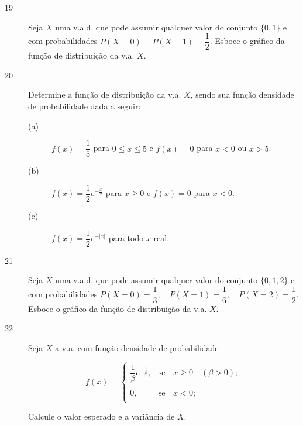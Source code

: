 \documentclass{report}
\begin{document}
\begin{description}

\item[{\large 19}] Seja $X$ uma v.a.d. que pode assumir qualquer valor do conjunto $\{0,1\}$ e com probabilidades $P(X=0)=P(X=1)=\dfrac{1}{2}$. Esboce o gráfico da função de distribuição da v.a. $X$.

\end{description}

\newpage

\begin{description}

\item[{\large 20}] Determine a função de distribuição da v.a. $X$, sendo sua função densidade de probabilidade dada a seguir:


\begin{description}

\item[(a)] $f(x)=\dfrac{1}{5}$ para $0\leq x\leq 5$ e $f(x)=0$ para $x<0$ ou $x>5$.
\item[(b)] $f(x)=\dfrac{1}{2}e^{-\frac{x}{2}}$ para $x\geq 0$ e $f(x)=0$ para $x<0$.
\item[(c)] $f(x)=\dfrac{1}{2}e^{-|x|}$ para todo $x$ real.
\end{description}

\end{description}

\begin{description}

\item[{\large 21}] Seja $X$ uma v.a.d. que pode assumir qualquer valor do conjunto $\{0,1,2\}$ e com probabilidades $P(X=0)=\dfrac{1}{3},\quad P(X=1)=\dfrac{1}{6},\quad P(X=2)=\dfrac{1}{2}$. Esboce o gráfico da função de distribuição da v.a. $X$.

\end{description}


\begin{description}

\item[{\large 22}] Seja $X$ a v.a. com função densidade de probabilidade

    \begin{center}
\begin{displaymath}
f(x)=\left\{
\begin{array}{ccccc}
\dfrac{1}{\beta}e^{-\frac{x}{\beta}},&\textrm{se}\quad x\geq 0 \quad (\beta > 0);\\
&\\
0,& \textrm{se}\quad x<0;\\
\end{array}
\right.
\end{displaymath}
\end{center}
 Calcule o valor esperado e a variância de $X$.

\end{description}
\end{document}
